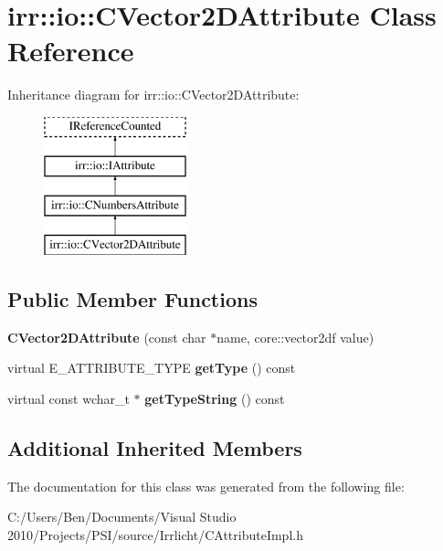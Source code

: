 \hypertarget{classirr_1_1io_1_1_c_vector2_d_attribute}{\section{irr\-:\-:io\-:\-:C\-Vector2\-D\-Attribute Class Reference}
\label{classirr_1_1io_1_1_c_vector2_d_attribute}
}
Inheritance diagram for irr\-:\-:io\-:\-:C\-Vector2\-D\-Attribute\-:\begin{figure}[H]
\begin{center}
\leavevmode
\includegraphics[height=4.000000cm]{classirr_1_1io_1_1_c_vector2_d_attribute}
\end{center}
\end{figure}
\subsection*{Public Member Functions}
\begin{DoxyCompactItemize}
\item 
\hypertarget{classirr_1_1io_1_1_c_vector2_d_attribute_a1dab90b25a143649f5a5d25cd688ed82}{{\bfseries C\-Vector2\-D\-Attribute} (const char $\ast$name, core\-::vector2df value)}\label{classirr_1_1io_1_1_c_vector2_d_attribute_a1dab90b25a143649f5a5d25cd688ed82}

\item 
\hypertarget{classirr_1_1io_1_1_c_vector2_d_attribute_a7979fe846bb575ee18fec5a4642b3d97}{virtual E\-\_\-\-A\-T\-T\-R\-I\-B\-U\-T\-E\-\_\-\-T\-Y\-P\-E {\bfseries get\-Type} () const }\label{classirr_1_1io_1_1_c_vector2_d_attribute_a7979fe846bb575ee18fec5a4642b3d97}

\item 
\hypertarget{classirr_1_1io_1_1_c_vector2_d_attribute_adbe2c2d991fceb04b1fa8d4ee1010007}{virtual const wchar\-\_\-t $\ast$ {\bfseries get\-Type\-String} () const }\label{classirr_1_1io_1_1_c_vector2_d_attribute_adbe2c2d991fceb04b1fa8d4ee1010007}

\end{DoxyCompactItemize}
\subsection*{Additional Inherited Members}


The documentation for this class was generated from the following file\-:\begin{DoxyCompactItemize}
\item 
C\-:/\-Users/\-Ben/\-Documents/\-Visual Studio 2010/\-Projects/\-P\-S\-I/source/\-Irrlicht/C\-Attribute\-Impl.\-h\end{DoxyCompactItemize}
